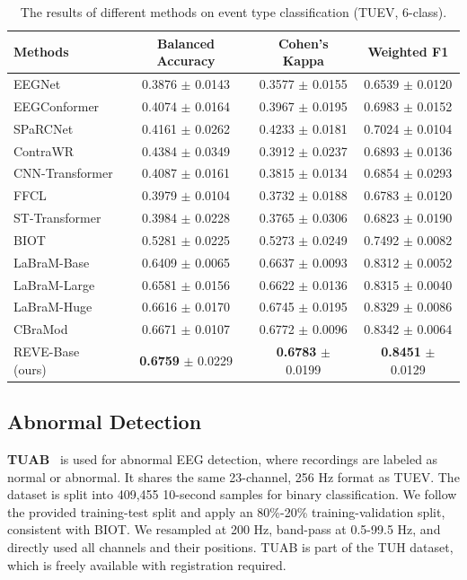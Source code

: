 \documentclass{article}
\begin{document}
\begin{table}[H]
\centering
\small
\caption{The results of different methods on event type classification (TUEV, 6-class).}
\begin{tabular}{lccc} 
\toprule
\textbf{Methods} & \textbf{Balanced Accuracy} & \textbf{Cohen’s Kappa} & \textbf{Weighted F1} \\
\midrule
EEGNet            & 0.3876 $\pm$ 0.0143 & 0.3577 $\pm$ 0.0155 & 0.6539 $\pm$ 0.0120 \\
EEGConformer      & 0.4074 $\pm$ 0.0164 & 0.3967 $\pm$ 0.0195 & 0.6983 $\pm$ 0.0152 \\
SPaRCNet          & 0.4161 $\pm$ 0.0262 & 0.4233 $\pm$ 0.0181 & 0.7024 $\pm$ 0.0104 \\
ContraWR          & 0.4384 $\pm$ 0.0349 & 0.3912 $\pm$ 0.0237 & 0.6893 $\pm$ 0.0136 \\
CNN-Transformer   & 0.4087 $\pm$ 0.0161 & 0.3815 $\pm$ 0.0134 & 0.6854 $\pm$ 0.0293 \\
FFCL              & 0.3979 $\pm$ 0.0104 & 0.3732 $\pm$ 0.0188 & 0.6783 $\pm$ 0.0120 \\
ST-Transformer    & 0.3984 $\pm$ 0.0228 & 0.3765 $\pm$ 0.0306 & 0.6823 $\pm$ 0.0190 \\
\midrule
BIOT              & 0.5281 $\pm$ 0.0225 & 0.5273 $\pm$ 0.0249 & 0.7492 $\pm$ 0.0082 \\
LaBraM-Base       & 0.6409 $\pm$ 0.0065 & 0.6637 $\pm$ 0.0093 & 0.8312 $\pm$ 0.0052 \\
LaBraM-Large      & 0.6581 $\pm$ 0.0156 & 0.6622 $\pm$ 0.0136 & 0.8315 $\pm$ 0.0040 \\
LaBraM-Huge       & 0.6616 $\pm$ 0.0170 & 0.6745 $\pm$ 0.0195 & 0.8329 $\pm$ 0.0086 \\
CBraMod           & 0.6671 $\pm$ 0.0107 & 0.6772 $\pm$ 0.0096 & 0.8342 $\pm$ 0.0064 \\
\midrule
REVE-Base (ours) & \textbf{0.6759} $\pm$ 0.0229& \textbf{0.6783} $\pm$ 0.0199&\textbf{0.8451} $\pm$ 0.0129\\
\bottomrule
\end{tabular}
\label{tab:Event}
\end{table}


\subsection{Abnormal Detection}

\textbf{TUAB}~\citep{obeid2016temple} is used for abnormal EEG detection, where recordings are labeled as normal or abnormal. It shares the same 23-channel, 256 Hz format as TUEV. The dataset is split into 409,455 10-second samples for binary classification. We follow the provided training-test split and apply an 80\%-20\% training-validation split, consistent with BIOT. We resampled at 200 Hz, band-pass at 0.5-99.5 Hz, and directly used all channels and their positions. TUAB is part of the TUH dataset, which is freely available with registration required.
\end{document}
